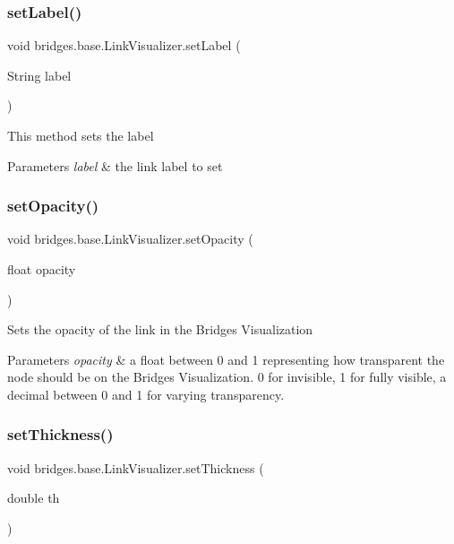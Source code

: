 \subsubsection{\texorpdfstring{setLabel()}{setLabel()}}
{\footnotesize\ttfamily void bridges.\+base.\+Link\+Visualizer.\+set\+Label (\begin{DoxyParamCaption}\item[{String}]{label }\end{DoxyParamCaption})}

This method sets the label


\begin{DoxyParams}{Parameters}
{\em label} & the link label to set \\
\hline
\end{DoxyParams}
\mbox{\label{classbridges_1_1base_1_1_link_visualizer_ac0d59614dbc65ed0a19c25c493a1deaa}} 
\subsubsection{\texorpdfstring{setOpacity()}{setOpacity()}}
{\footnotesize\ttfamily void bridges.\+base.\+Link\+Visualizer.\+set\+Opacity (\begin{DoxyParamCaption}\item[{float}]{opacity }\end{DoxyParamCaption})}

Sets the opacity of the link in the Bridges Visualization


\begin{DoxyParams}{Parameters}
{\em opacity} & a float between 0 and 1 representing how transparent the node should be on the Bridges Visualization. 0 for invisible, 1 for fully visible, a decimal between 0 and 1 for varying transparency. \\
\hline
\end{DoxyParams}
\mbox{\label{classbridges_1_1base_1_1_link_visualizer_a702e9ca345d1a4a035baf2041f275849}} 
\subsubsection{\texorpdfstring{setThickness()}{setThickness()}}
{\footnotesize\ttfamily void bridges.\+base.\+Link\+Visualizer.\+set\+Thickness (\begin{DoxyParamCaption}\item[{double}]{th }\end{DoxyParamCaption})}

